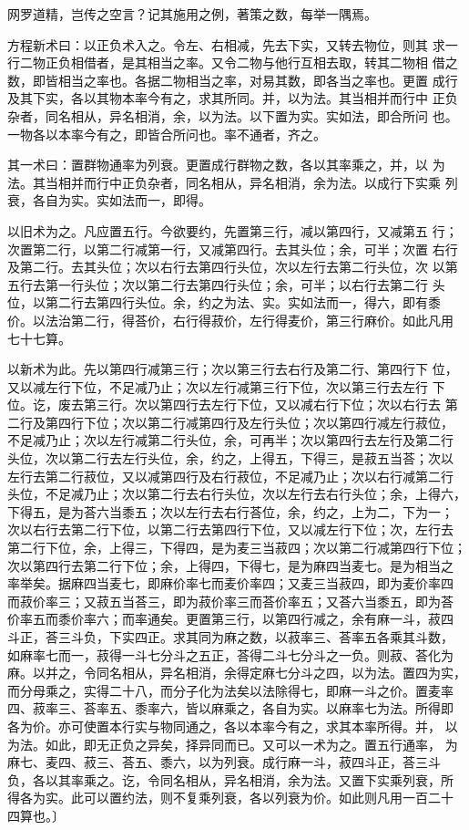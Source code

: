 \documentclass[12pt,UTF8]{ctexbook}
\begin{document}
网罗道精，岂传之空言？记其施用之例，著策之数，每举一隅焉。

方程新术曰：以正负术入之。令左、右相减，先去下实，又转去物位，则其 求一行二物正负相借者，是其相当之率。又令二物与他行互相去取，转其二物相 借之数，即皆相当之率也。各据二物相当之率，对易其数，即各当之率也。更置 成行及其下实，各以其物本率今有之，求其所同。并，以为法。其当相并而行中 正负杂者，同名相从，异名相消，余，以为法。以下置为实。实如法，即合所问 也。一物各以本率今有之，即皆合所问也。率不通者，齐之。

其一术曰：置群物通率为列衰。更置成行群物之数，各以其率乘之，并，以 为法。其当相并而行中正负杂者，同名相从，异名相消，余为法。以成行下实乘 列衰，各自为实。实如法而一，即得。

以旧术为之。凡应置五行。今欲要约，先置第三行，减以第四行，又减第五 行；次置第二行，以第二行减第一行，又减第四行。去其头位；余，可半；次置 右行及第二行。去其头位；次以右行去第四行头位，次以左行去第二行头位，次 以第五行去第一行头位；次以第二行去第四行头位；余，可半；以右行去第二行 头位，以第二行去第四行头位。余，约之为法、实。实如法而一，得六，即有黍 价。以法治第二行，得荅价，右行得菽价，左行得麦价，第三行麻价。如此凡用 七十七算。

以新术为此。先以第四行减第三行；次以第三行去右行及第二行、第四行下 位，又以减左行下位，不足减乃止；次以左行减第三行下位，次以第三行去左行 下位。讫，废去第三行。次以第四行去左行下位，又以减右行下位；次以右行去 第二行及第四行下位；次以第二行减第四行及左行头位；次以第四行减左行菽位， 不足减乃止；次以左行减第二行头位，余，可再半；次以第四行去左行及第二行 头位，次以第二行去左行头位，余，约之，上得五，下得三，是菽五当荅；次以 左行去第二行菽位，又以减第四行及右行菽位，不足减乃止；次以右行减第二行 头位，不足减乃止；次以第二行去右行头位，次以左行去右行头位；余，上得六， 下得五，是为荅六当黍五；次以左行去右行荅位，余，约之，上为二，下为一； 次以右行去第二行下位，以第二行去第四行下位，又以减左行下位；次，左行去 第二行下位，余，上得三，下得四，是为麦三当菽四；次以第二行减第四行下位； 次以第四行去第二行下位；余，上得四，下得七，是为麻四当麦七。是为相当之 率举矣。据麻四当麦七，即麻价率七而麦价率四；又麦三当菽四，即为麦价率四 而菽价率三；又菽五当荅三，即为菽价率三而荅价率五；又荅六当黍五，即为荅 价率五而黍价率六；而率通矣。更置第三行，以第四行减之，余有麻一斗，菽四 斗正，荅三斗负，下实四正。求其同为麻之数，以菽率三、荅率五各乘其斗数， 如麻率七而一，菽得一斗七分斗之五正，荅得二斗七分斗之一负。则菽、荅化为 麻。以并之，令同名相从，异名相消，余得定麻七分斗之四，以为法。置四为实， 而分母乘之，实得二十八，而分子化为法矣以法除得七，即麻一斗之价。置麦率 四、菽率三、荅率五、黍率六，皆以麻乘之，各自为实。以麻率七为法。所得即 各为价。亦可使置本行实与物同通之，各以本率今有之，求其本率所得。并， 以为法。如此，即无正负之异矣，择异同而已。又可以一术为之。置五行通率， 为麻七、麦四、菽三、荅五、黍六，以为列衰。成行麻一斗，菽四斗正，荅三斗 负，各以其率乘之。讫，令同名相从，异名相消，余为法。又置下实乘列衰，所 得各为实。此可以置约法，则不复乘列衰，各以列衰为价。如此则凡用一百二十 四算也。〕 
\end{document}
